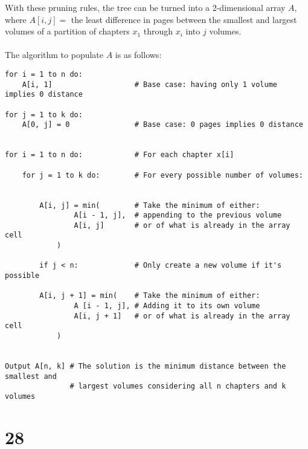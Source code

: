 \documentclass[letterpaper,notitlepage,twoside]{article}
\begin{document}
With these pruning rules, the tree can be turned into a 2-dimensional array $A$,
where $A[i, j] =$ the least difference in pages between the smallest and largest
 volumes of a partition of chapters $x_1$ through $x_i$ into $j$ volumes.
\\\\
The algorithm to populate $A$ is as follows:
\begin{verbatim}
for i = 1 to n do:
    A[i, 1]                   # Base case: having only 1 volume implies 0 distance

for j = 1 to k do:
    A[0, j] = 0               # Base case: 0 pages implies 0 distance


for i = 1 to n do:            # For each chapter x[i]

    for j = 1 to k do:        # For every possible number of volumes:


        A[i, j] = min(        # Take the minimum of either:
                A[i - 1, j],  # appending to the previous volume
                A[i, j]       # or of what is already in the array cell
            )

        if j < n:             # Only create a new volume if it's possible

        A[i, j + 1] = min(    # Take the minimum of either:
                A [i - 1, j], # Adding it to its own volume
                A[i, j + 1]   # or of what is already in the array cell
            )


Output A[n, k] # The solution is the minimum distance between the smallest and
               # largest volumes considering all n chapters and k volumes
\end{verbatim}

\section*{28}
\end{document}
